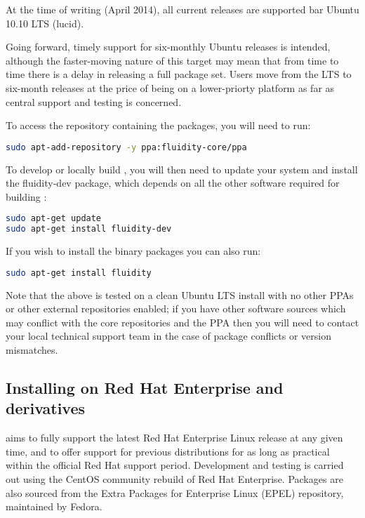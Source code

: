 At the time of writing (April 2014), all current releases are supported bar
Ubuntu 10.10 LTS (lucid).

Going forward, timely support for six-monthly Ubuntu releases is intended,
although the faster-moving nature of this target may mean that from time to
time there is a delay in releasing a full \fluidity package set. Users move
from the LTS to six-month releases at the price of being on a lower-priorty
platform as far as central \fluidity support and testing is concerned.

To access the repository containing the \fluidity packages, you will
need to run:

\begin{lstlisting}[language=bash]
sudo apt-add-repository -y ppa:fluidity-core/ppa
\end{lstlisting}

To develop or locally build \fluidity, you will then need to update your system
and install the fluidity-dev package, which depends on all the other software
required for building \fluidity:


\begin{lstlisting}[language=bash]
sudo apt-get update
sudo apt-get install fluidity-dev
\end{lstlisting}

If you wish to install the \fluidity binary packages you can also run:

\begin{lstlisting}[language=bash]
sudo apt-get install fluidity
\end{lstlisting}

Note that the above is tested on a clean Ubuntu LTS install with no other PPAs
or other external repositories enabled; if you have other software sources
which may conflict with the core repositories and the \fluidity PPA then you
will need to contact your local technical support team in the case of package
conflicts or version mismatches.

\subsection{Installing on Red Hat Enterprise and derivatives}
\label{sec:required_libraries_redhat}

\fluidity aims to fully support the latest Red Hat Enterprise Linux release at any given
time, and to offer support for previous distributions for as long as practical
within the official Red Hat support period. Development and testing is carried
out using the CentOS community rebuild of Red Hat Enterprise. Packages are also
sourced from the Extra Packages for Enterprise Linux (EPEL) repository,
maintained by Fedora.

